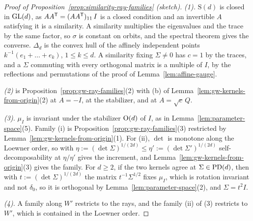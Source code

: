 \begin{proof}[Proof of Proposition~\ref{prop:similarity-ray-families} (sketch)]
\emph{(1).} $\mathrm S(d)$ is closed in $\mathrm{GL}(d)$, as $AA^{\mathsf{T}} = (AA^{\mathsf{T}})_{11}\,I$ is a closed
condition and an invertible $A$ satisfying it is a similarity. A
similarity multiplies the eigenvalues and the trace by the same factor, so $\sigma$ is constant on
orbits, and the spectral theorem gives the converse. $\Delta_d$ is the convex hull of the affinely
independent points $k^{-1}(e_1 + \dots + e_k)$, $1 \le k \le d$. A similarity fixing $\Sigma \ne 0$ has $c = 1$ by
the traces, and a $\Sigma$ commuting with every orthogonal matrix is a multiple of $I$, by the
reflections and permutations of the proof of Lemma~\ref{lem:affine-gauge}.

\emph{(2)} is Proposition~\ref{prop:gw-ray-families}(2) with (b) of
Lemma~\ref{lem:gw-kernels-from-origin}(2) at $A = -I$, at the stabilizer, and at $A = \sqrt c\,Q$.

\emph{(3).} $\mu_I$ is invariant under the stabilizer $\mathrm{O}(d)$ of $I$, as in
Lemma~\ref{lem:parameter-space}(5). Family (i) is Proposition~\ref{prop:gw-ray-families}(3) restricted by
Lemma~\ref{lem:gw-kernels-from-origin}(1). For (ii), $\det$ is monotone along the Loewner order, so with
$\eta := (\det\Sigma)^{1/(2d)} \le \eta' := (\det\Sigma')^{1/(2d)}$ self-decomposability at
$\eta/\eta'$ gives the increment, and Lemma~\ref{lem:gw-kernels-from-origin}(3) gives the family.
For $d \ge 2$, if the two kernels agree at $\Sigma \in \mathrm{PD}(d)$, then with $t := (\det\Sigma)^{1/(2d)}$
the matrix $t^{-1}\Sigma^{1/2}$ fixes $\mu_I$, which is rotation invariant and not $\delta_0$, so it is
orthogonal by Lemma~\ref{lem:parameter-space}(2), and $\Sigma = t^2I$.

\emph{(4).} A family along $W'$ restricts to the rays, and the family (ii) of (3) restricts to $W'$,
which is contained in the Loewner order.
\end{proof}

